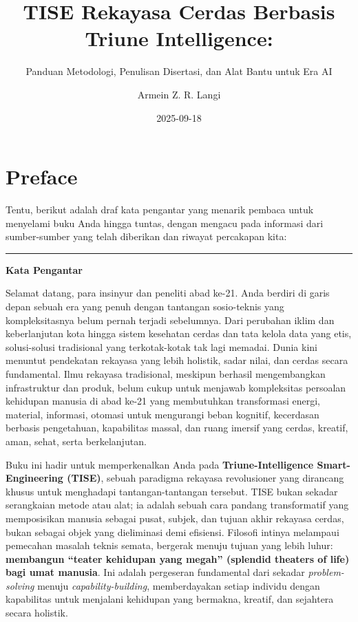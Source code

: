 \documentclass[
  letterpaper,
  DIV=11,
  numbers=noendperiod]{scrreprt}
\title{TISE Rekayasa Cerdas Berbasis Triune Intelligence:}
\subtitle{Panduan Metodologi, Penulisan Disertasi, dan Alat Bantu untuk
Era AI}
\author{Armein Z. R. Langi}
\date{2025-09-18}
\renewcommand*\contentsname{Table of contents}
\newcommand\contentsname{Table of contents}
\begin{document}
\maketitle

\renewcommand*\contentsname{Table of contents}
{
\hypersetup{linkcolor=}
\setcounter{tocdepth}{2}
\tableofcontents
}


\chapter*{Preface}\label{preface}


Tentu, berikut adalah draf kata pengantar yang menarik pembaca untuk
menyelami buku Anda hingga tuntas, dengan mengacu pada informasi dari
sumber-sumber yang telah diberikan dan riwayat percakapan kita:

\begin{center}\rule{0.5\linewidth}{0.5pt}\end{center}

\textbf{Kata Pengantar}

Selamat datang, para insinyur dan peneliti abad ke-21. Anda berdiri di
garis depan sebuah era yang penuh dengan tantangan sosio-teknis yang
kompleksitasnya belum pernah terjadi sebelumnya. Dari perubahan iklim
dan keberlanjutan kota hingga sistem kesehatan cerdas dan tata kelola
data yang etis, solusi-solusi tradisional yang terkotak-kotak tak lagi
memadai. Dunia kini menuntut pendekatan rekayasa yang lebih holistik,
sadar nilai, dan cerdas secara fundamental. Ilmu rekayasa tradisional,
meskipun berhasil mengembangkan infrastruktur dan produk, belum cukup
untuk menjawab kompleksitas persoalan kehidupan manusia di abad ke-21
yang membutuhkan transformasi energi, material, informasi, otomasi untuk
mengurangi beban kognitif, kecerdasan berbasis pengetahuan, kapabilitas
massal, dan ruang imersif yang cerdas, kreatif, aman, sehat, serta
berkelanjutan.

Buku ini hadir untuk memperkenalkan Anda pada
\textbf{Triune-Intelligence Smart-Engineering (TISE)}, sebuah paradigma
rekayasa revolusioner yang dirancang khusus untuk menghadapi
tantangan-tantangan tersebut. TISE bukan sekadar serangkaian metode atau
alat; ia adalah sebuah cara pandang transformatif yang memposisikan
manusia sebagai pusat, subjek, dan tujuan akhir rekayasa cerdas, bukan
sebagai objek yang dieliminasi demi efisiensi. Filosofi intinya
melampaui pemecahan masalah teknis semata, bergerak menuju tujuan yang
lebih luhur: \textbf{membangun ``teater kehidupan yang megah'' (splendid
theaters of life) bagi umat manusia}. Ini adalah pergeseran fundamental
dari sekadar \emph{problem-solving} menuju \emph{capability-building},
memberdayakan setiap individu dengan kapabilitas untuk menjalani
kehidupan yang bermakna, kreatif, dan sejahtera secara holistik.
\end{document}
